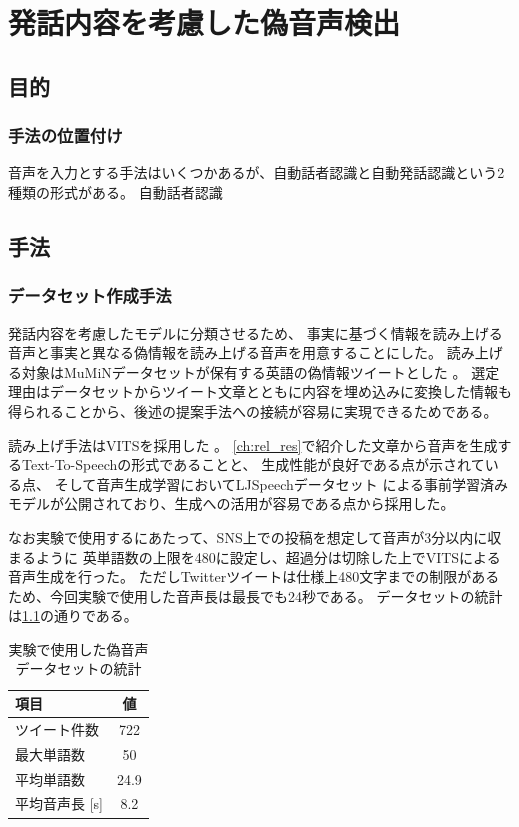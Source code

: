 \chapter{発話内容を考慮した偽音声検出}\label{ch:spc_cnt}
\section{目的}\label{sec:cnt_pur}
\subsection{手法の位置付け}
音声を入力とする手法はいくつかあるが、自動話者認識と自動発話認識という2種類の形式がある。
自動話者認識

\section{手法}\label{sec:cnt_mtd}
\subsection{データセット作成手法}\label{ssc:spc_ds}
発話内容を考慮したモデルに分類させるため、
事実に基づく情報を読み上げる音声と事実と異なる偽情報を読み上げる音声を用意することにした。
読み上げる対象はMuMiNデータセットが保有する英語の偽情報ツイートとした \cite{10.1145/3477495.3531744}。
選定理由はデータセットからツイート文章とともに内容を埋め込みに変換した情報も得られることから、後述の提案手法への接続が容易に実現できるためである。

読み上げ手法はVITSを採用した \cite{pmlr-v139-kim21f}。
\cref{ch:rel_res}で紹介した文章から音声を生成するText-To-Speechの形式であることと、
生成性能が良好である点が示されている点、
そして音声生成学習においてLJSpeechデータセット \cite{ljspeech17}による事前学習済みモデルが公開されており、生成への活用が容易である点から採用した。

なお実験で使用するにあたって、SNS上での投稿を想定して音声が3分以内に収まるように
英単語数の上限を480に設定し、超過分は切除した上でVITSによる音声生成を行った。
ただしTwitterツイートは仕様上480文字までの制限があるため、今回実験で使用した音声長は最長でも24秒である。
データセットの統計は\cref{tb:dataset}の通りである。

\begin{table}[h]
    \centering
    \caption{実験で使用した偽音声データセットの統計}
    \begin{tabular}{lc}\hline
        項目 & 値\\\hline\hline
        ツイート件数 & 722\\
        最大単語数 & 50\\
        平均単語数 & 24.9\\
        平均音声長 [\si{s}] & 8.2\\\hline
    \end{tabular}
    \label{tb:dataset}
\end{table}

